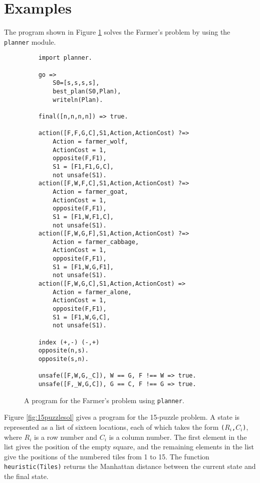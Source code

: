 \section{Examples}
The program shown in Figure \ref{fig:farmer2} solves the Farmer's problem by using the \texttt{planner} module. 

\begin{figure}
\begin{center}
\begin{verbatim}
    import planner.

    go =>
        S0=[s,s,s,s],
        best_plan(S0,Plan),
        writeln(Plan).

    final([n,n,n,n]) => true.

    action([F,F,G,C],S1,Action,ActionCost) ?=>
        Action = farmer_wolf,
        ActionCost = 1,        
        opposite(F,F1),
        S1 = [F1,F1,G,C],
        not unsafe(S1).
    action([F,W,F,C],S1,Action,ActionCost) ?=>
        Action = farmer_goat,
        ActionCost = 1,        
        opposite(F,F1),
        S1 = [F1,W,F1,C],
        not unsafe(S1).
    action([F,W,G,F],S1,Action,ActionCost) ?=>
        Action = farmer_cabbage,
        ActionCost = 1,        
        opposite(F,F1),
        S1 = [F1,W,G,F1],
        not unsafe(S1).
    action([F,W,G,C],S1,Action,ActionCost) =>
        Action = farmer_alone,
        ActionCost = 1,        
        opposite(F,F1),
        S1 = [F1,W,G,C],
        not unsafe(S1).

    index (+,-) (-,+)
    opposite(n,s).
    opposite(s,n).

    unsafe([F,W,G,_C]), W == G, F !== W => true.
    unsafe([F,_W,G,C]), G == C, F !== G => true.
\end{verbatim}
\end{center}
\caption{\label{fig:farmer2}A program for the Farmer's problem using \texttt{planner}.}
\end{figure}

Figure \ref{fig:15puzzlesol} gives a program for the 15-puzzle problem. A state is represented as a list of sixteen locations, each of which takes the form \texttt{($R_i$,$C_i$)}, where $R_i$ is a row number and $C_i$ is a column number. The first element in the list gives the position of the empty square, and the remaining elements in the list give the positions of the numbered tiles from 1 to 15. The function \texttt{heuristic(Tiles)} returns the Manhattan distance between the current state and the final state.

